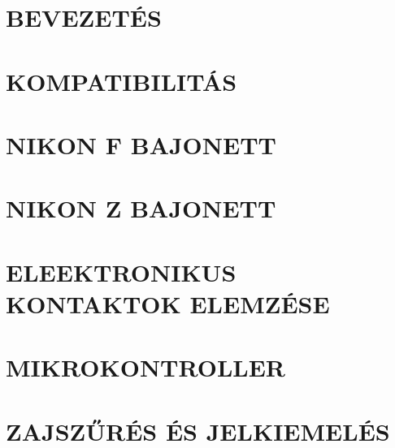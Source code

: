 








%

%
%
%


\newpage
\tableofcontents
\newpage





\clearpage
\section{BEVEZETÉS}

\clearpage
\section{KOMPATIBILITÁS}

\clearpage
\section{NIKON F BAJONETT}

\clearpage
\section{NIKON Z BAJONETT}

\clearpage
\section{ELEEKTRONIKUS KONTAKTOK ELEMZÉSE}

\clearpage
\section{MIKROKONTROLLER}

\clearpage
\section{ZAJSZŰRÉS ÉS JELKIEMELÉS}

\clearpage
